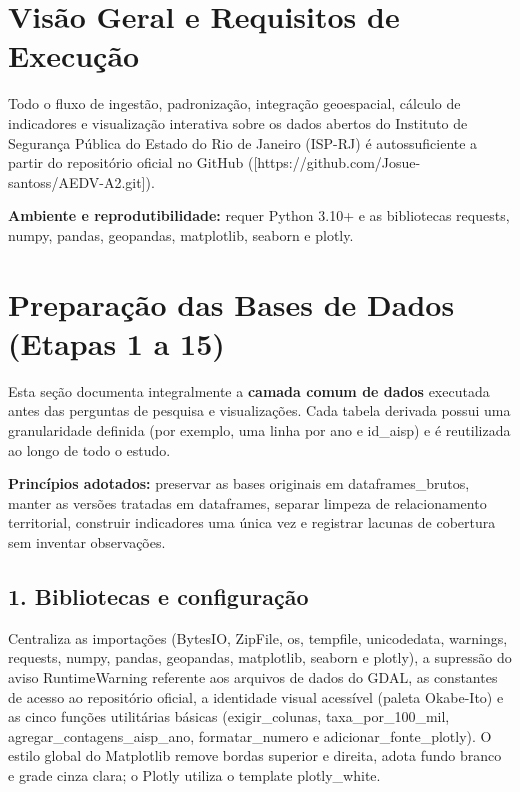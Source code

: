\documentclass[11pt,a4paper]{article}
\newcommand{\code}[1]{{\ttfamily\footnotesize\allowbreak #1}}
\begin{document}
\begin{abstract}
Esta documentação descreve a arquitetura computacional, o pipeline completo de preparação e tratamento de dados, as decisões metodológicas de código e de design visual e a referência integral das 13 funções implementadas no projeto.
\end{abstract}

\tableofcontents
\vspace{8pt}

\section{Visão Geral e Requisitos de Execução}

Todo o fluxo de ingestão, padronização, integração geoespacial, cálculo de indicadores e visualização interativa sobre os dados abertos do Instituto de Segurança Pública do Estado do Rio de Janeiro (ISP-RJ) é autossuficiente a partir do repositório oficial no GitHub ([https://github.com/Josue-santoss/AEDV-A2.git]).

\textbf{Ambiente e reprodutibilidade:} requer Python 3.10+ e as bibliotecas \code{requests}, \code{numpy}, \code{pandas}, \code{geopandas}, \code{matplotlib}, \code{seaborn} e \code{plotly}. 

\section{Preparação das Bases de Dados (Etapas 1 a 15)}

Esta seção documenta integralmente a \textbf{camada comum de dados} executada antes das perguntas de pesquisa e visualizações. Cada tabela derivada possui uma granularidade definida (por exemplo, uma linha por \code{ano} e \code{id\_aisp}) e é reutilizada ao longo de todo o estudo.

\textbf{Princípios adotados:} preservar as bases originais em \code{dataframes\_brutos}, manter as versões tratadas em \code{dataframes}, separar limpeza de relacionamento territorial, construir indicadores uma única vez e registrar lacunas de cobertura sem inventar observações.



\subsection{1. Bibliotecas e configuração}
Centraliza as importações (\code{BytesIO}, \code{ZipFile}, \code{os}, \code{tempfile}, \code{unicodedata}, \code{warnings}, \code{requests}, \code{numpy}, \code{pandas}, \code{geopandas}, \code{matplotlib}, \code{seaborn} e \code{plotly}), a supressão do aviso \code{RuntimeWarning} referente aos arquivos de dados do GDAL, as constantes de acesso ao repositório oficial, a identidade visual acessível (paleta Okabe-Ito) e as cinco funções utilitárias básicas (\code{exigir\_colunas}, \code{taxa\_por\_100\_mil}, \code{agregar\_contagens\_aisp\_ano}, \code{formatar\_numero} e \code{adicionar\_fonte\_plotly}). O estilo global do Matplotlib remove bordas superior e direita, adota fundo branco e grade cinza clara; o Plotly utiliza o template \code{plotly\_white}.
\end{document}
